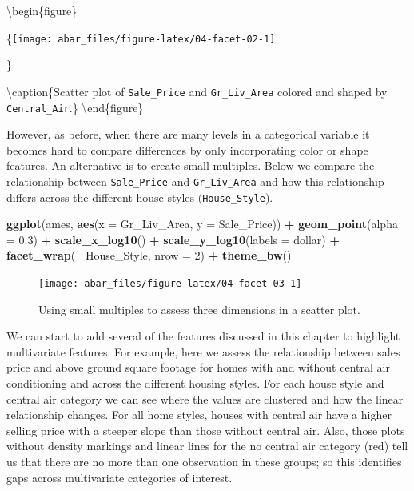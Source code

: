 \documentclass[]{book}
\newenvironment{Shaded}{\begin{snugshade}}{\end{snugshade}}
\newcommand{\DataTypeTok}[1]{\textcolor[rgb]{0.13,0.29,0.53}{#1}}
\newcommand{\DecValTok}[1]{\textcolor[rgb]{0.00,0.00,0.81}{#1}}
\newcommand{\FloatTok}[1]{\textcolor[rgb]{0.00,0.00,0.81}{#1}}
\newcommand{\KeywordTok}[1]{\textcolor[rgb]{0.13,0.29,0.53}{\textbf{#1}}}
\newcommand{\NormalTok}[1]{#1}
\newcommand{\OperatorTok}[1]{\textcolor[rgb]{0.81,0.36,0.00}{\textbf{#1}}}
\newcommand{\StringTok}[1]{\textcolor[rgb]{0.31,0.60,0.02}{#1}}
\theoremstyle{definition}
\theoremstyle{definition}
\theoremstyle{definition}
\theoremstyle{remark}
\begin{document}
\textbackslash{}begin\{figure\}

\{\centering \texttt{[image: abar\_files/figure-latex/04-facet-02-1]}

\}

\textbackslash{}caption\{Scatter plot of \texttt{Sale\_Price} and
\texttt{Gr\_Liv\_Area} colored and shaped by
\texttt{Central\_Air}.\}\label{fig:04-facet-02}
\textbackslash{}end\{figure\}

However, as before, when there are many levels in a categorical variable
it becomes hard to compare differences by only incorporating color or
shape features. An alternative is to create small multiples. Below we
compare the relationship between \texttt{Sale\_Price} and
\texttt{Gr\_Liv\_Area} and how this relationship differs across the
different house styles (\texttt{House\_Style}).

\begin{Shaded}
\begin{Highlighting}[]
\KeywordTok{ggplot}\NormalTok{(ames, }\KeywordTok{aes}\NormalTok{(}\DataTypeTok{x =}\NormalTok{ Gr_Liv_Area, }\DataTypeTok{y =}\NormalTok{ Sale_Price)) }\OperatorTok{+}
\StringTok{  }\KeywordTok{geom_point}\NormalTok{(}\DataTypeTok{alpha =} \FloatTok{0.3}\NormalTok{) }\OperatorTok{+}
\StringTok{  }\KeywordTok{scale_x_log10}\NormalTok{() }\OperatorTok{+}
\StringTok{  }\KeywordTok{scale_y_log10}\NormalTok{(}\DataTypeTok{labels =}\NormalTok{ dollar) }\OperatorTok{+}
\StringTok{  }\KeywordTok{facet_wrap}\NormalTok{(}\OperatorTok{~}\StringTok{ }\NormalTok{House_Style, }\DataTypeTok{nrow =} \DecValTok{2}\NormalTok{) }\OperatorTok{+}
\StringTok{  }\KeywordTok{theme_bw}\NormalTok{()}
\end{Highlighting}
\end{Shaded}

\begin{figure}

{\centering \texttt{[image: abar\_files/figure-latex/04-facet-03-1]} 

}

\caption{Using small multiples to assess three dimensions in a scatter plot.}\label{fig:04-facet-03}
\end{figure}

We can start to add several of the features discussed in this chapter to
highlight multivariate features. For example, here we assess the
relationship between sales price and above ground square footage for
homes with and without central air conditioning and across the different
housing styles. For each house style and central air category we can see
where the values are clustered and how the linear relationship changes.
For all home styles, houses with central air have a higher selling price
with a steeper slope than those without central air. Also, those plots
without density markings and linear lines for the no central air
category (red) tell us that there are no more than one observation in
these groups; so this identifies gaps across multivariate categories of
interest.
\end{document}

